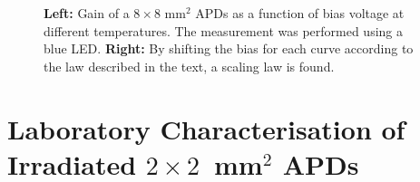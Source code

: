 \documentclass[review,number,sort&compress]{elsarticle}
\begin{document}
\begin{figure}[h]
  \centering
  \hfill
  \caption{\textbf{Left:} Gain of a $8 \times 8$ mm$^2$ APDs as a function of bias voltage at different temperatures. The measurement was performed using a blue LED. \textbf{Right:} By shifting the bias for each curve according to the law described in the text, a scaling law is found.}
  \label{fig:gainVsV}
\end{figure}

\section{Laboratory Characterisation of Irradiated $2 \times 2$~mm$^2$ APDs}
\label{sec:irrad2x2}
\end{document}
